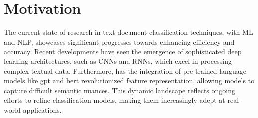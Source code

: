 \section{Motivation}

The current state of research in text document classification techniques, with ML and NLP, showcases significant progresses towards enhancing efficiency and accuracy. Recent developments have seen the emergence of sophisticated deep learning architectures, such as CNNs and RNNs, which excel in processing complex textual data. Furthermore, has the integration of pre-trained language models like \ac{gpt} and \ac{bert} revolutionized feature representation, allowing models to capture difficult semantic nuances. This dynamic landscape reflects ongoing efforts to refine classification models, making them increasingly adept at real-world applications.












